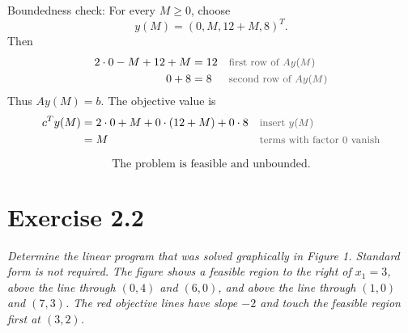 \documentclass[a4paper,11pt]{article}
\newif\ifexplain
\newcommand{\aufgabe}[1]{\section*{#1}}
\newcommand{\angabe}[1]{\textit{#1}\par\smallskip}
\newcommand{\why}[1]{\text{\small\color{black!65}#1}}
\newcommand{\explain}[1]{\ifexplain\begin{erklbox}#1\end{erklbox}\fi}
\begin{document}
Boundedness check:
For every $M\ge0$, choose
\[
y(M)=(0,M,12+M,8)^T.
\]
Then
\begin{align*}
2\cdot0-M+12+M&=12 && \why{first row of $Ay(M)$}\\
0+8&=8 && \why{second row of $Ay(M)$}
\end{align*}
Thus $Ay(M)=b$.
The objective value is
\begin{align*}
c^Ty(M)&=2\cdot0+M+0\cdot(12+M)+0\cdot8 && \why{insert $y(M)$}\\
&=M && \why{terms with factor $0$ vanish}
\end{align*}
\explain{Da $M$ beliebig groß gewählt werden kann, werden auch die Zielfunktionswerte beliebig groß. Das ist bei Maximierung genau Unbeschränktheit.}
\[
\boxed{\text{The problem is feasible and unbounded.}}
\]

\aufgabe{Exercise 2.2}
\angabe{Determine the linear program that was solved graphically in Figure 1. Standard form is not required. The figure shows a feasible region to the right of $x_1=3$, above the line through $(0,4)$ and $(6,0)$, and above the line through $(1,0)$ and $(7,3)$. The red objective lines have slope $-2$ and touch the feasible region first at $(3,2)$.}
\explain{Aus einer gezeichneten Geraden lesen wir zwei Punkte ab. Daraus wird ihre Gleichung bestimmt. Bei einer Zielfunktionsgeraden $c_1x_1+c_2x_2=\alpha$ ist die Steigung $-c_1/c_2$. Die rote Steigung $-2$ passt zu $2x_1+x_2=\alpha$.}
\end{document}
